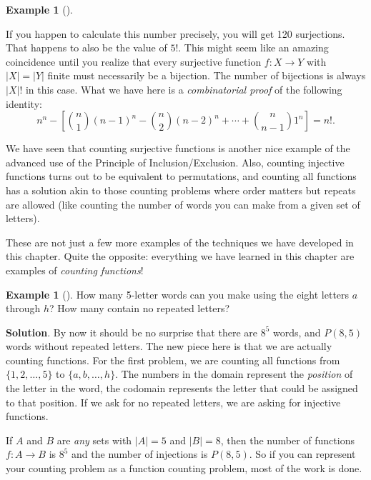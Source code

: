 \documentclass[10pt,]{book}
\theoremstyle{plain}
\theoremstyle{definition}
\theoremstyle{definition}
\newtheorem{example}[theorem]{Example}
\theoremstyle{definition}
\theoremstyle{definition}
\numberwithin{equation}{chapter}
\newcommand{\card}[1]{\left| #1 \right|}
\begin{document}
\begin{example}[]
\begin{enumerate}
\par
\hypertarget{p-1013}{}%
If you happen to calculate this number precisely, you will get 120 surjections.  That happens to also be the value of \(5!\).  This might seem like an amazing coincidence until you realize that every surjective function \(f:X \to Y\) with \(\card{X} = \card{Y}\) finite must necessarily be a bijection.  The number of bijections is always \(\card{X}!\) in this case.  What we have here is a \emph{combinatorial proof} of the following identity:%
\begin{equation*}
n^n - \left[{n\choose 1}(n-1)^n - {n \choose 2}(n-2)^n + \cdots + {n \choose n-1}1^n \right] = n!.
\end{equation*}
%
\end{enumerate}
%
\end{example}
\hypertarget{p-1014}{}%
We have seen that counting surjective functions is another nice example of the advanced use of the Principle of Inclusion/Exclusion. Also, counting injective functions turns out to be equivalent to permutations, and counting all functions has a solution akin to those counting problems where order matters but repeats are allowed (like counting the number of words you can make from a given set of letters).%
\par
\hypertarget{p-1015}{}%
These are not just a few more examples of the techniques we have developed in this chapter. Quite the opposite: everything we have learned in this chapter are examples of \emph{counting functions}!%
\begin{example}[]\label{example-20}
\hypertarget{p-1016}{}%
How many 5-letter words can you make using the eight letters \(a\) through \(h\)? How many contain no repeated letters?%
\par\smallskip%
\noindent\textbf{Solution}.\hypertarget{solution-87}{}\quad%
\hypertarget{p-1017}{}%
By now it should be no surprise that there are \(8^5\) words, and \(P(8,5)\) words without repeated letters. The new piece here is that we are actually counting functions. For the first problem, we are counting all functions from \(\{1,2,\ldots, 5\}\) to \(\{a,b,\ldots, h\}\). The numbers in the domain represent the \emph{position} of the letter in the word, the codomain represents the letter that could be assigned to that position. If we ask for no repeated letters, we are asking for injective functions.%
\par
\hypertarget{p-1018}{}%
If \(A\) and \(B\) are \emph{any} sets with \(|A| = 5\) and \(|B| = 8\), then the number of functions \(f: A \to B\) is \(8^5\) and the number of injections is \(P(8,5)\). So if you can represent your counting problem as a function counting problem, most of the work is done.%
\end{example}
\end{document}
